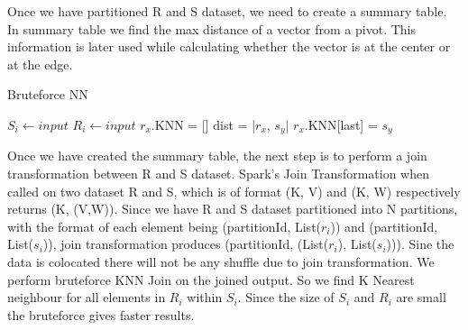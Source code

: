 Once we have partitioned R and S dataset, we need to create a summary
table. In summary table we find the max distance of a vector from a
pivot. This information is later used while calculating whether the
vector is at the center or at the edge.

\begin{algorithm}
  \caption{Bruteforce NN}
  \label{algo_bruteforce_nn}
  \begin{algorithmic}[1]
    \STATE $S_i \leftarrow input$
    \STATE $R_i \leftarrow input$
    \STATE $r_x$.KNN = []
    \STATE dist = |$r_x$, $s_y$|
    \STATE $r_x$.KNN[last] = $s_y$
    \ENDIF
    \ENDFOR
    \ENDFOR
  \end{algorithmic}
\end{algorithm}


Once we have created the summary table, the next step is to perform a join transformation between R
and S dataset. Spark's Join Transformation when called on two dataset R and S,
which is of format (K, V) and (K, W) respectively returns (K,
(V,W)). Since we have R and S dataset partitioned into N partitions,
with the format of each element being (partitionId, List($r_i$)) and
(partitionId, List($s_i$)), join transformation produces (partitionId,
(List($r_i$), List($s_i$))). Sine the data is colocated there will not
be any shuffle due to join transformation. We perform bruteforce KNN
Join on the joined output. So we find K Nearest neighbour for all
elements in $R_i$ within $S_i$. Since the size of $S_i$ and $R_i$ are
small the bruteforce gives faster results.

\begin{center}
\begin{figure}
\caption{ }
\label{fig_triangle_inequality}
\end{figure}
\end{center}

